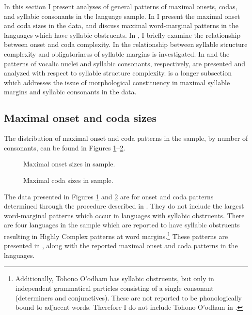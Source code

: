   In this section I present analyses of general patterns of maximal onsets, codas, and syllabic consonants in the language sample. In  I present the maximal onset and coda sizes in the data, and discuss maximal word-marginal patterns in the languages which have syllabic obstruents. In , I briefly examine the relationship between onset and coda complexity. In  the relationship between syllable structure complexity and obligatoriness of syllable margins is investigated. In  and  the patterns of vocalic nuclei and syllabic consonants, respectively, are presented and analyzed with respect to syllable structure complexity.  is a longer subsection which addresses the issue of morphological constituency in maximal syllable margins and syllabic consonants in the data.

\subsection{Maximal onset and coda sizes}\label{sec:3.3.1}

  The distribution of maximal onset and coda patterns in the sample, by number of consonants, can be found in Figures \ref{fig:3.1}--\ref{fig:3.2}.

\begin{figure}  
\caption{\label{fig:3.1} Maximal onset sizes in sample.}
\end{figure}


\begin{figure}
\caption{\label{fig:3.2} Maximal coda sizes in sample.}
\end{figure}

  The data presented in Figures \ref{fig:3.1} and \ref{fig:3.2} are for onset and coda patterns determined through the procedure described in . They do not include the largest word-marginal patterns which occur in languages with syllabic obstruents. There are four languages in the sample which are reported to have syllabic obstruents resulting in Highly Complex patterns at word margins.\footnote{{Additionally, Tohono O’odham has syllabic obstruents, but only in independent grammatical particles consisting of a single consonant (determiners and conjunctives). These are not reported to be phonologically bound to adjacent words. Therefore I do not include Tohono O’odham in .}} These patterns are presented in , along with the reported maximal onset and coda patterns in the languages.

